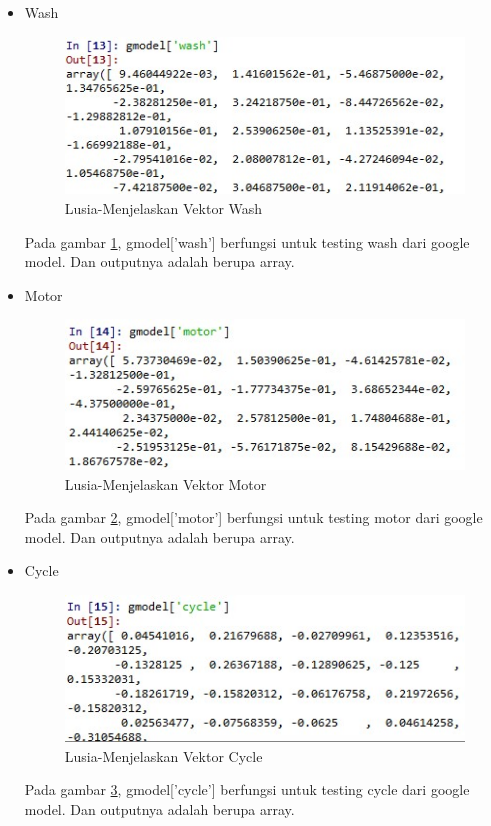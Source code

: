 \begin{enumerate}
\begin{enumerate}
\begin{itemize}
				\item Wash
					\begin{figure}[!hbtp]
					\centering
					\includegraphics[scale=0.45]{figures/chap5i.jpg}
					\caption{Lusia-Menjelaskan Vektor Wash}
					\label{5b10}
					\end{figure}
					\par Pada gambar \ref{5b10}, gmodel['wash'] berfungsi untuk testing wash dari google model. Dan outputnya adalah berupa array. 
					
				\item Motor
					\begin{figure}[!hbtp]
					\centering
					\includegraphics[scale=0.45]{figures/chap5j.jpg}
					\caption{Lusia-Menjelaskan Vektor Motor}
					\label{5b11}
					\end{figure}
					\par Pada gambar \ref{5b11}, gmodel['motor'] berfungsi untuk testing motor dari google model. Dan outputnya adalah berupa array. 
					
				\item Cycle
					\begin{figure}[!hbtp]
					\centering
					\includegraphics[scale=0.45]{figures/chap5k.jpg}
					\caption{Lusia-Menjelaskan Vektor Cycle}
					\label{5b12}
					\end{figure}
					\par Pada gambar \ref{5b12}, gmodel['cycle'] berfungsi untuk testing cycle dari google model. Dan outputnya adalah berupa array. 
			\end{itemize}
			

\end{enumerate}
\end{enumerate}
